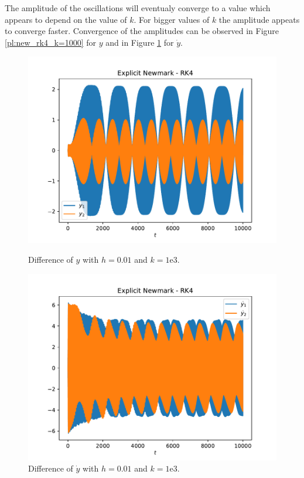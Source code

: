 \documentclass{report}
\begin{document}
The amplitude of the oscillations will eventualy converge to a value which appears to depend on the value of $k$. For bigger values of $k$ the amplitude appeats to converge faster. Convergence of the amplitudes can be observed in Figure \ref{pl:new_rk4_k=1000} for $y$ and in Figure \ref{pl:new_rk4_k=1000_dot} for $\dot{y}$.

\begin{figure}[h]
\centering
\begin{minipage}[t]{0.45\textwidth}
\centering
\includegraphics[width=\textwidth]{../Plots/Diff_Proj3/Real/New-RK4_k=1E3_t=1E5_y}
\caption{Difference of $y$ with $h=0.01$ and $k=1\mathrm{e}{3}$.}
\label{pl:new_rk4_k=1000}
\end{minipage}
\hfill
\begin{minipage}[t]{0.45\textwidth}
\centering
\includegraphics[width=\textwidth]{../Plots/Diff_Proj3/Real/New-RK4_k=1E3_t=1E5_ydot}
\caption{Difference of $\dot{y}$ with $h=0.01$ and $k=1\mathrm{e}{3}$.}
\label{pl:new_rk4_k=1000_dot}
\end{minipage}
\end{figure}
\end{document}
